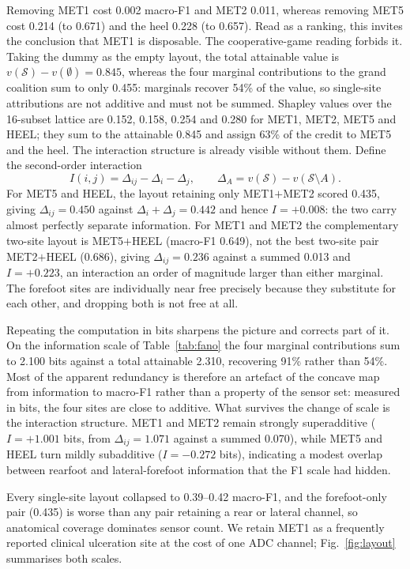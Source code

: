 \documentclass[10pt,conference,a4paper]{IEEEtran}
\begin{document}
Removing MET1 cost 0.002 macro-F1 and MET2 0.011, whereas removing MET5 cost
0.214 (to 0.671) and the heel 0.228 (to 0.657). Read as a ranking, this invites
the conclusion that MET1 is disposable. The cooperative-game reading forbids
it. Taking the dummy as the empty layout, the total attainable value is
$v(\mathcal{S})-v(\emptyset)=0.845$, whereas the four marginal contributions to
the grand coalition sum to only 0.455: marginals recover 54\% of the value, so
single-site attributions are not additive and must not be summed. Shapley values
over the 16-subset lattice are 0.152, 0.158, 0.254 and 0.280 for MET1, MET2,
MET5 and HEEL; they sum to the attainable 0.845 and assign 63\% of the credit to
MET5 and the heel. The interaction structure is already visible without them.
Define the second-order interaction
\begin{equation}
I(i,j)=\Delta_{ij}-\Delta_i-\Delta_j,\qquad
\Delta_A = v(\mathcal{S})-v(\mathcal{S}\setminus A).
\label{eq:inter}
\end{equation}
For MET5 and HEEL, the layout retaining only MET1$+$MET2 scored 0.435, giving
$\Delta_{ij}=0.450$ against $\Delta_i+\Delta_j=0.442$ and hence
$I=+0.008$: the two carry almost perfectly separate information. For MET1 and
MET2 the complementary two-site layout is MET5$+$HEEL (macro-F1 0.649), not the
best two-site pair MET2$+$HEEL (0.686), giving $\Delta_{ij}=0.236$ against a
summed 0.013 and $I=+0.223$, an interaction an order of magnitude larger than
either marginal. The forefoot sites are individually near free precisely because
they substitute for each other, and dropping both is not free at all.

Repeating the computation in bits sharpens the picture and corrects part of it.
On the information scale of Table~\ref{tab:fano} the four marginal
contributions sum to 2.100 bits against a total attainable 2.310, recovering
91\% rather than 54\%. Most of the apparent redundancy is therefore an
artefact of the concave map from information to macro-F1 rather than a property
of the sensor set: measured in bits, the four sites are close to additive. What
survives the change of scale is the interaction structure. MET1 and MET2 remain
strongly superadditive ($I=+1.001$ bits, from $\Delta_{ij}=1.071$ against a
summed 0.070), while MET5 and HEEL turn mildly subadditive ($I=-0.272$ bits),
indicating a modest overlap between rearfoot and lateral-forefoot information
that the F1 scale had hidden.

Every single-site layout collapsed to 0.39--0.42 macro-F1, and the
forefoot-only pair (0.435) is worse than any pair retaining a rear or lateral
channel, so anatomical coverage dominates sensor count. We retain MET1 as a
frequently reported clinical ulceration site \cite{armstrong2017,fernando2014}
at the cost of one ADC channel; Fig.~\ref{fig:layout} summarises both scales.
\end{document}
